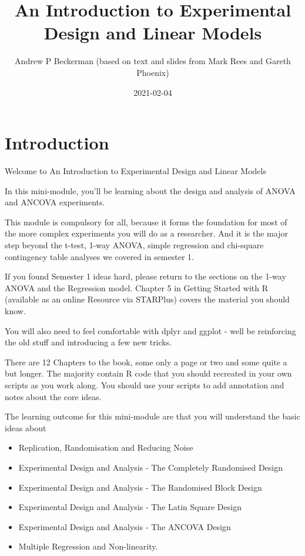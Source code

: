 \documentclass[
]{book}
\title{An Introduction to Experimental Design and Linear Models}
\author{Andrew P Beckerman (based on text and slides from Mark Rees and Gareth Phoenix)}
\date{2021-02-04}
\providecommand{\tightlist}{%
  \setlength{\itemsep}{0pt}\setlength{\parskip}{0pt}}
\begin{document}
\maketitle

{
\setcounter{tocdepth}{1}
\tableofcontents
}
\hypertarget{introduction}{%
\chapter{Introduction}\label{introduction}}

Welcome to An Introduction to Experimental Design and Linear Models

In this mini-module, you'll be learning about the design and analysis of ANOVA and ANCOVA experiments.

This module is compulsory for all, because it forms the foundation for most of the more complex experiments you will do as a researcher. And it is the major step beyond the t-test, 1-way ANOVA, simple regression and chi-square contingency table analyses we covered in semester 1.

If you found Semester 1 ideas hard, please return to the sections on the 1-way ANOVA and the Regression model. Chapter 5 in Getting Started with R (available as an online Resource via STARPlus) covers the material you should know.

You will also need to feel comfortable with dplyr and ggplot - well be reinforcing the old stuff and introducing a few new tricks.

There are 12 Chapters to the book, some only a page or two and some quite a but longer. The majority contain R code that you should recreated in your own scripts as you work along. You should use your scripts to add annotation and notes about the core ideas.

The learning outcome for this mini-module are that you will understand the basic ideas about

\begin{itemize}
\tightlist
\item
  Replication, Randomisation and Reducing Noise
\item
  Experimental Design and Analysis - The Completely Randomised Design
\item
  Experimental Design and Analysis - The Randomised Block Design
\item
  Experimental Design and Analysis - The Latin Square Design
\item
  Experimental Design and Analysis - The ANCOVA Design
\item
  Multiple Regression and Non-linearity.
\end{itemize}
\end{document}
